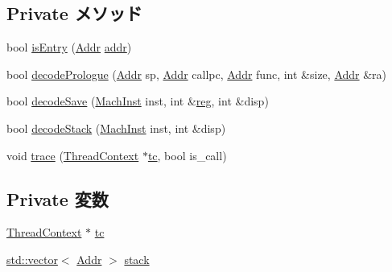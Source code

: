 \subsection*{Private メソッド}
\begin{DoxyCompactItemize}
\item 
bool \hyperlink{classX86ISA_1_1StackTrace_a8c9787d05f9c0e82dfcaf31cf0fd4b50}{isEntry} (\hyperlink{base_2types_8hh_af1bb03d6a4ee096394a6749f0a169232}{Addr} \hyperlink{namespaceX86ISA_ab705917f60c5566f9ce56a93f798b2e2}{addr})
\item 
bool \hyperlink{classX86ISA_1_1StackTrace_a875eea16b2891accc8cbec7eb6c36003}{decodePrologue} (\hyperlink{base_2types_8hh_af1bb03d6a4ee096394a6749f0a169232}{Addr} sp, \hyperlink{base_2types_8hh_af1bb03d6a4ee096394a6749f0a169232}{Addr} callpc, \hyperlink{base_2types_8hh_af1bb03d6a4ee096394a6749f0a169232}{Addr} func, int \&size, \hyperlink{base_2types_8hh_af1bb03d6a4ee096394a6749f0a169232}{Addr} \&ra)
\item 
bool \hyperlink{classX86ISA_1_1StackTrace_ae56dad5982b67d8717714c383b6a59f8}{decodeSave} (\hyperlink{namespaceX86ISA_a7ceadb544bf9b4a10579b7466b0ac008}{MachInst} inst, int \&\hyperlink{namespaceX86ISA_aeeb02ad833ab76f3430553ef93213a6b}{reg}, int \&disp)
\item 
bool \hyperlink{classX86ISA_1_1StackTrace_a61ba7618f77dc6e62d7b0baf6273130c}{decodeStack} (\hyperlink{namespaceX86ISA_a7ceadb544bf9b4a10579b7466b0ac008}{MachInst} inst, int \&disp)
\item 
void \hyperlink{classX86ISA_1_1StackTrace_a46d6b95a2e5fdb75702cf45e39566645}{trace} (\hyperlink{classThreadContext}{ThreadContext} $\ast$\hyperlink{classX86ISA_1_1StackTrace_a4455a4759e69e5ebe68ae7298cbcc37d}{tc}, bool is\_\-call)
\end{DoxyCompactItemize}
\subsection*{Private 変数}
\begin{DoxyCompactItemize}
\item 
\hyperlink{classThreadContext}{ThreadContext} $\ast$ \hyperlink{classX86ISA_1_1StackTrace_a4455a4759e69e5ebe68ae7298cbcc37d}{tc}
\item 
\hyperlink{classstd_1_1vector}{std::vector}$<$ \hyperlink{base_2types_8hh_af1bb03d6a4ee096394a6749f0a169232}{Addr} $>$ \hyperlink{classX86ISA_1_1StackTrace_a8be39169db4f31c77f5188de23c602f1}{stack}
\end{DoxyCompactItemize}


